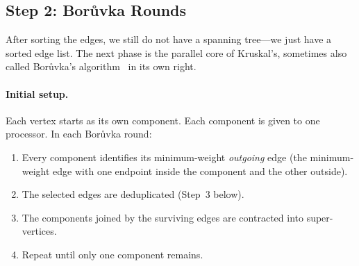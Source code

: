\subsection{Step 2: Bor\r{u}vka Rounds}

After sorting the edges, we still do not have a spanning tree---we
just have a sorted edge list.  The next phase is the parallel core of
Kruskal's, sometimes also called Bor\r{u}vka's algorithm~\cite{boruvka1926} in its own right.

\paragraph{Initial setup.}
Each vertex starts as its own component.  Each component is given to
one processor.  In each Bor\r{u}vka round:

\begin{enumerate}
  \item Every component identifies its minimum-weight \emph{outgoing}
        edge (the minimum-weight edge with one endpoint inside the
        component and the other outside).
  \item The selected edges are deduplicated (Step~3 below).
  \item The components joined by the surviving edges are contracted
        into super-vertices.
  \item Repeat until only one component remains.
\end{enumerate}

